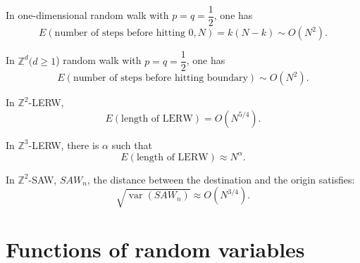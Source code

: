 \documentclass[11pt,singlecolumn, openany, citestyle=authoryear]{elegantbook}
\begin{document}
\begin{CJK}{UTF8}{gbsn}
\begin{exercise}
    In one-dimensional random walk with $p=q=\dfrac{1}{2}$, one has
    $$
    E(\text{number of steps before hitting }0,N)=k(N-k)\sim O(N^2).
    $$ 
\end{exercise}

\begin{exercise}
    In $\mathbb{Z}^d(d\geqslant 1$) random walk with $p=q=\dfrac{1}{2}$, one has
    $$
    E(\text{number of steps before hitting boundary})\sim O(N^2).
    $$ 
\end{exercise}

\begin{theorem}
    In $\mathbb{Z}^2$-LERW,
    $$
    E(\text{length of LERW})=O(N^{5/4}).
    $$

    In $\mathbb{Z}^3$-LERW, there is $\alpha$ such that 
    $$
    E(\text{length of LERW})\approx N^\alpha.
    $$
\end{theorem}

\begin{theorem}
    In $\mathbb{Z}^2$-SAW,  $SAW_n$,
    the distance between the destination and the origin satisfies:
    $$
    \sqrt{\operatorname{var}(SAW_n)}\approx O(N^{3/4}).
    $$
\end{theorem}
    


\chapter{Functions of random variables}

\end{CJK}
\end{document}
